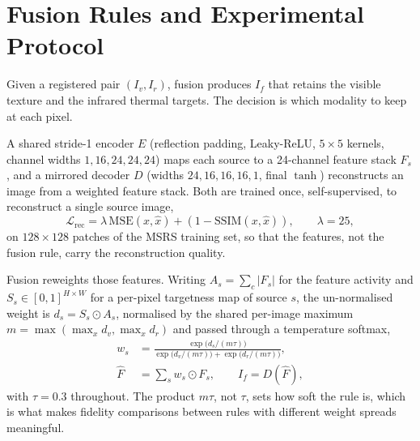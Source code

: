 \documentclass[10pt,a4paper]{article}
\begin{document}
\section{Fusion Rules and Experimental Protocol}
\label{sec:method}

\begin{sloppypar}
Given a registered pair $(I_v,I_r)$, fusion produces $I_f$ that retains the visible
texture and the infrared thermal targets. The decision is which modality to keep at
each pixel.

A shared stride-1 encoder $E$ (reflection padding, Leaky-ReLU, $5\times5$ kernels,
channel widths $1,16,24,24,24$) maps each source to a 24-channel feature stack
$F_s$, and a mirrored decoder $D$ (widths $24,16,16,16,1$, final $\tanh$) reconstructs
an image from a weighted feature stack. Both are trained once, self-supervised, to
reconstruct a single source image,
\begin{equation}
\mathcal{L}_{\mathrm{rec}} = \lambda\,\mathrm{MSE}(x,\hat{x}) + (1-\mathrm{SSIM}(x,\hat{x})),\qquad \lambda=25,
\end{equation}
on $128\times128$ patches of the MSRS training set, so that the features, not the
fusion rule, carry the reconstruction quality.

Fusion reweights those features. Writing $A_s=\sum_c|F_s|$ for the feature activity and
$S_s\in[0,1]^{H\times W}$ for a per-pixel targetness map of source $s$, the
un-normalised weight is $d_s=S_s\odot A_s$, normalised by the shared per-image maximum
$m=\max(\max_x d_v,\max_x d_r)$ and passed through a temperature softmax,
\begin{equation}
\begin{aligned}
w_s&=\frac{\exp\!\big(d_s/(m\tau)\big)}
{\exp\!\big(d_v/(m\tau)\big)+\exp\!\big(d_r/(m\tau)\big)},\\
\hat{F}&=\sum_s w_s\odot F_s,\qquad I_f=D(\hat{F}),
\end{aligned}
\label{eq:rule}
\end{equation}
with $\tau=0.3$ throughout. The product $m\tau$, not $\tau$, sets how soft the rule
is, which is what makes fidelity comparisons between rules with different weight
spreads meaningful.


\end{sloppypar}
\end{document}

